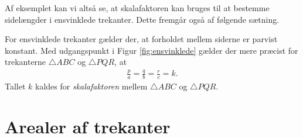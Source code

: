 Af eksemplet kan vi altså se, at skalafaktoren kan bruges til at bestemme sidelængder i ensvinklede trekanter. Dette fremgår også af følgende sætning.
\begin{setn}
	For ensvinklede trekanter gælder der, at forholdet mellem siderne er parvist konstant. Med udgangspunkt i 
	Figur \ref{fig:ensvinklede} gælder der mere præcist for trekanterne $\triangle ABC$ og $\triangle PQR$, at
	\begin{align*}
		\frac{p}{a} = \frac{q}{b} = \frac{r}{c} = k.
	\end{align*}
	Tallet $k$ kaldes for \textit{skalafaktoren} mellem $\triangle ABC$ og $\triangle PQR$.
\end{setn}

\section*{Arealer af trekanter}

